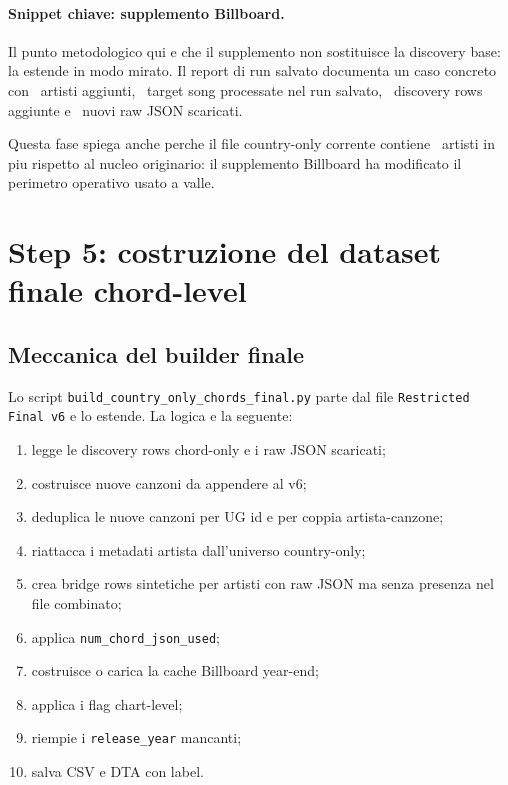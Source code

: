 \documentclass[11pt]{article}
\begin{document}
\paragraph{Snippet chiave: supplemento Billboard.}




Il punto metodologico qui e che il supplemento non sostituisce la discovery base: la estende in modo mirato. Il report di run salvato documenta un caso concreto con \SupplementAddedArtists\ artisti aggiunti, \SupplementTargetSongs\ target song processate nel run salvato, \SupplementRows\ discovery rows aggiunte e \SupplementNewDownloads\ nuovi raw JSON scaricati.

Questa fase spiega anche perche il file country-only corrente contiene \BillboardAddedArtists\ artisti in piu rispetto al nucleo originario: il supplemento Billboard ha modificato il perimetro operativo usato a valle.

\section{Step 5: costruzione del dataset finale chord-level}
\subsection{Meccanica del builder finale}
Lo script \texttt{build\_country\_only\_chords\_final.py} parte dal file \texttt{Restricted Final v6} e lo estende. La logica e la seguente:
\begin{enumerate}[leftmargin=2em]
\item legge le discovery rows chord-only e i raw JSON scaricati;
\item costruisce nuove canzoni da appendere al v6;
\item deduplica le nuove canzoni per UG id e per coppia artista-canzone;
\item riattacca i metadati artista dall'universo country-only;
\item crea bridge rows sintetiche per artisti con raw JSON ma senza presenza nel file combinato;
\item applica \texttt{num\_chord\_json\_used};
\item costruisce o carica la cache Billboard year-end;
\item applica i flag chart-level;
\item riempie i \texttt{release\_year} mancanti;
\item salva CSV e DTA con label.
\end{enumerate}
\end{document}
